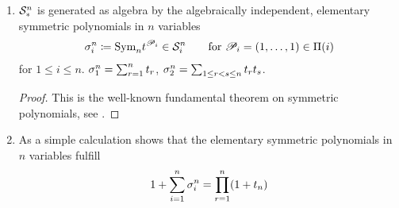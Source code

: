\begin{LemDef}
\begin{enumerate}
\begin{proof}
      as a sum of symmetrised polynomials.
    \end{proof}
  \item $\mathcal{S}^{n}_*$ is generated as algebra by the algebraically
    independent, elementary symmetric polynomials in $n$ variables
    \begin{gather*}
      \sigma_{i}^{n}\coloneqq \text{\normalfont Sym}_{n} t^{\mathscr{P}_i}
      \in \mathcal{S}^{n}_i
      \qquad \text{for }
      \mathscr{P}_i = (1,\dotsc,1)
      \in \Pi({i})
    \end{gather*}
    for $1\leq i\leq n$.
    \Forexample
    $\sigma_{1}^{n}=\sum_{r=1}^{n}t_r$,
    $\sigma_{2}^{n}=\sum_{1\leq r<s\leq n} t_r t_s$.
    \begin{proof}
      This is the well-known fundamental theorem on symmetric
      polynomials, see \forexample
      \cite[Chap.~4.4, Satz~1]{bosch2013algebra}. 
    \end{proof}
  \item As a simple calculation shows that the elementary symmetric
    polynomials in $n$ variables fulfill
    \begin{gather}\label{eq:sumelemsymmpoly}
      1 + \sum_{i=1}^{n} \sigma_{i}^{n}
      = \prod_{r=1}^{n}(1+t_n)
    \end{gather}
  \end{enumerate}
\end{LemDef}

